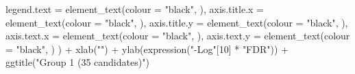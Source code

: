 \documentclass[
  11pt,
  oneside]{book}
\newenvironment{Shaded}{\begin{snugshade}}{\end{snugshade}}
\newcommand{\AttributeTok}[1]{\textcolor[rgb]{0.77,0.63,0.00}{#1}}
\newcommand{\DecValTok}[1]{\textcolor[rgb]{0.00,0.00,0.81}{#1}}
\newcommand{\FunctionTok}[1]{\textcolor[rgb]{0.00,0.00,0.00}{#1}}
\newcommand{\NormalTok}[1]{#1}
\newcommand{\SpecialCharTok}[1]{\textcolor[rgb]{0.00,0.00,0.00}{#1}}
\newcommand{\StringTok}[1]{\textcolor[rgb]{0.31,0.60,0.02}{#1}}
\begin{document}
\begin{Shaded}
\begin{Highlighting}[]
    \AttributeTok{legend.text =} \FunctionTok{element\_text}\NormalTok{(}\AttributeTok{colour =} \StringTok{"black"}\NormalTok{, ),}
    \AttributeTok{axis.title.x =} \FunctionTok{element\_text}\NormalTok{(}\AttributeTok{colour =} \StringTok{"black"}\NormalTok{, ),}
    \AttributeTok{axis.title.y =} \FunctionTok{element\_text}\NormalTok{(}\AttributeTok{colour =} \StringTok{"black"}\NormalTok{, ),}
    \AttributeTok{axis.text.x =} \FunctionTok{element\_text}\NormalTok{(}\AttributeTok{colour =} \StringTok{"black"}\NormalTok{, ),}
    \AttributeTok{axis.text.y =} \FunctionTok{element\_text}\NormalTok{(}\AttributeTok{colour =} \StringTok{"black"}\NormalTok{, )}
\NormalTok{  ) }\SpecialCharTok{+}
  \FunctionTok{xlab}\NormalTok{(}\StringTok{""}\NormalTok{) }\SpecialCharTok{+}
  \FunctionTok{ylab}\NormalTok{(}\FunctionTok{expression}\NormalTok{(}\StringTok{"{-}Log"}\NormalTok{[}\DecValTok{10}\NormalTok{] }\SpecialCharTok{*} \StringTok{"FDR"}\NormalTok{)) }\SpecialCharTok{+}
  \FunctionTok{ggtitle}\NormalTok{(}\StringTok{"Group 1 (35 candidates)"}\NormalTok{)}
\end{Highlighting}
\end{Shaded}
\end{document}
